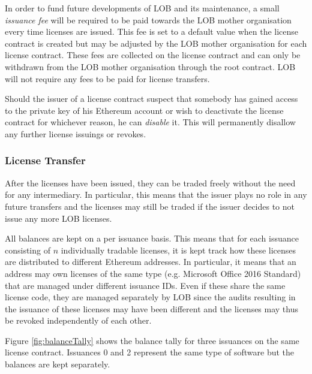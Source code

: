 \documentclass[a4paper]{article}
\begin{document}
In order to fund future developments of LOB and its maintenance, a small \emph{issuance fee} will be required to be paid towards the LOB mother organisation every time licenses are issued. This fee is set to a default value when the license contract is created but may be adjusted by the LOB mother organisation for each license contract. These fees are collected on the license contract and can only be withdrawn from the LOB mother organisation through the root contract. LOB will not require any fees to be paid for license transfers.

Should the issuer of a license contract suspect that somebody has gained access to the private key of his Ethereum account or wish to deactivate the license contract for whichever reason, he can \emph{disable} it. This will permanently disallow any further license issuings or revokes. 





\subsubsection{License Transfer}
\label{ch:licenseContractTransfer}

After the licenses have been issued, they can be traded freely without the need for any intermediary. In particular, this means that the issuer plays no role in any future transfers and the licenses may still be traded if the issuer decides to not issue any more LOB licenses.

All balances are kept on a per issuance basis. This means that for each issuance consisting of $n$ individually tradable licenses, it is kept track how these licenses are distributed to different Ethereum addresses. In particular, it means that an address may own licenses of the same type (e.g. Microsoft Office 2016 Standard) that are managed under different issuance IDs. Even if these share the same license code, they are managed separately by LOB since the audits resulting in the issuance of these licenses may have been different and the licenses may thus be revoked independently of each other.

Figure \ref{fig:balanceTally} shows the balance tally for three issuances on the same license contract. Issuances 0 and 2 represent the same type of software but the balances are kept separately.
\end{document}
